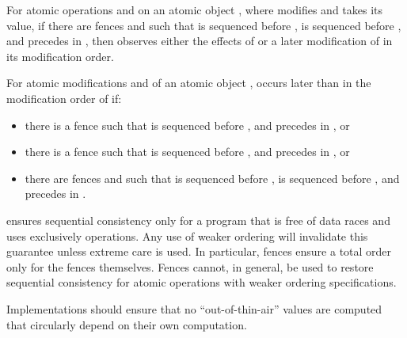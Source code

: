 \pnum
For atomic operations  and  on an atomic object , where
 modifies  and  takes its value, if there are
 fences  and  such that  is
sequenced before ,  is sequenced before , and 
precedes  in , then  observes either the effects of
 or a later modification of  in its modification order.

\pnum
For atomic modifications  and  of an atomic object ,
 occurs later than  in the modification order of  if:

\begin{itemize}
\item there is a  fence  such that 
is sequenced before , and  precedes  in , or
\item there is a  fence  such that 
is sequenced before , and  precedes  in , or
\item there are  fences  and  such that 
is sequenced before ,  is sequenced before ,
and  precedes  in .
\end{itemize}


\pnum
\begin{note}  ensures sequential consistency only for a
program that is free of data races and uses exclusively 
operations. Any use of weaker ordering will invalidate this guarantee unless extreme
care is used. In particular,  fences ensure a total order
only for the fences themselves. Fences cannot, in general, be used to restore sequential
consistency for atomic operations with weaker ordering specifications. \end{note}

\pnum
Implementations should ensure that no ``out-of-thin-air'' values are computed that
circularly depend on their own computation.

